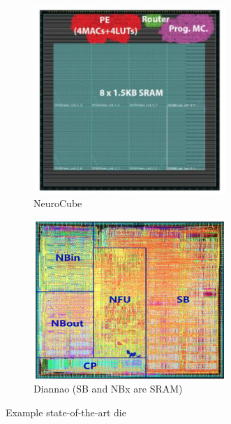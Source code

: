 {{%
\vspace{-1mm}
\begin{figure}
\centering
\begin{subfigure}{.45\textwidth}
  \centering
  \includegraphics[width=0.8\textwidth]{Chapter-2/figs/kim2016neurocube_fig4}
  \captionsetup{justification=centering, skip=6pt}
  \caption{NeuroCube}
  \label{fig:NeuroCubeDie}
\end{subfigure}%
\begin{subfigure}{.45\textwidth}
  \centering
  \includegraphics[width=0.8\textwidth]{Chapter-2/figs/chen2014diannao_fig15}
  \captionsetup{justification=centering, skip=10pt}
  \caption{Diannao (SB and NBx are SRAM)}
  \label{fig:DiannaoDie}
\end{subfigure}
\captionsetup{justification=centering, skip=3pt}
\caption{Example state-of-the-art die}
\label{fig:Example state-of-the-art die}
\end{figure}
\vspace{-5mm}
\fi


}}
